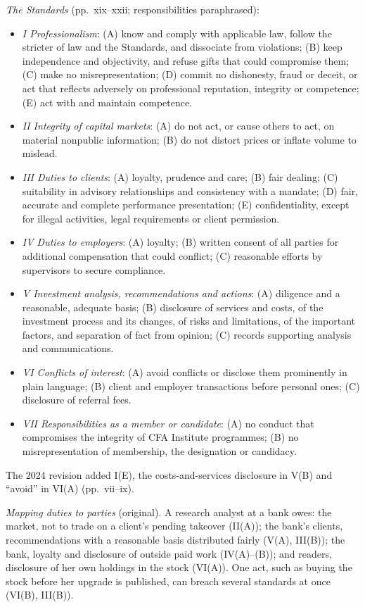 \begin{qfdefinition}
\emph{The Standards} (pp.~xix--xxii; responsibilities paraphrased):
\begin{itemize}
\item \emph{I Professionalism}: (A) know and comply with applicable law, follow the stricter of law and the Standards, and dissociate from violations; (B) keep independence and objectivity, and refuse gifts that could compromise them; (C) make no misrepresentation; (D) commit no dishonesty, fraud or deceit, or act that reflects adversely on professional reputation, integrity or competence; (E) act with and maintain competence.
\item \emph{II Integrity of capital markets}: (A) do not act, or cause others to act, on material nonpublic information; (B) do not distort prices or inflate volume to mislead.
\item \emph{III Duties to clients}: (A) loyalty, prudence and care; (B) fair dealing; (C) suitability in advisory relationships and consistency with a mandate; (D) fair, accurate and complete performance presentation; (E) confidentiality, except for illegal activities, legal requirements or client permission.
\item \emph{IV Duties to employers}: (A) loyalty; (B) written consent of all parties for additional compensation that could conflict; (C) reasonable efforts by supervisors to secure compliance.
\item \emph{V Investment analysis, recommendations and actions}: (A) diligence and a reasonable, adequate basis; (B) disclosure of services and costs, of the investment process and its changes, of risks and limitations, of the important factors, and separation of fact from opinion; (C) records supporting analysis and communications.
\item \emph{VI Conflicts of interest}: (A) avoid conflicts or disclose them prominently in plain language; (B) client and employer transactions before personal ones; (C) disclosure of referral fees.
\item \emph{VII Responsibilities as a member or candidate}: (A) no conduct that compromises the integrity of CFA Institute programmes; (B) no misrepresentation of membership, the designation or candidacy.
\end{itemize}
The 2024 revision added I(E), the costs-and-services disclosure in V(B) and ``avoid'' in VI(A) (pp.~vii--ix).

 \emph{Mapping duties to parties} (original). A research analyst at a bank owes: the market, not to trade on a client's pending takeover (II(A)); the bank's clients, recommendations with a reasonable basis distributed fairly (V(A), III(B)); the bank, loyalty and disclosure of outside paid work (IV(A)--(B)); and readers, disclosure of her own holdings in the stock (VI(A)). One act, such as buying the stock before her upgrade is published, can breach several standards at once (VI(B), III(B)).


\end{qfdefinition}
